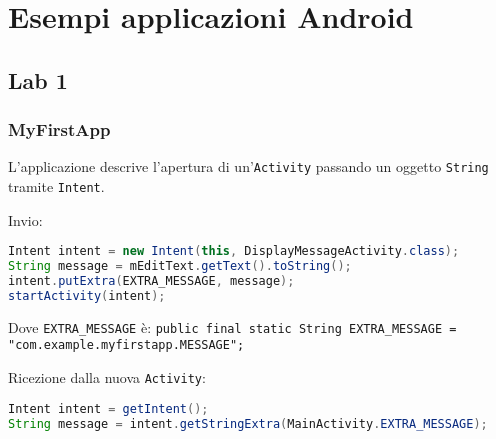 \newcommand{\Activity}{\texttt{Activity}\xspace}
\newcommand{\Intent}{\texttt{Intent}\xspace}
\newcommand{\View}{\texttt{View}\xspace}
\newcommand{\ViewGroup}{\texttt{ViewGroup}\xspace}
\newcommand{\LinearLayout}{\texttt{LinearLayout}\xspace}
\newcommand{\RelativeLayout}{\texttt{RelativeLayout}\xspace}
\newcommand{\ScrollView}{\texttt{ScrollView}\xspace}
\newcommand{\ListView}{\texttt{ListView}\xspace}
\newcommand{\SharedPreferences}{\texttt{SharedPreferences}\xspace}
\newcommand{\ListFragment}{\texttt{ListFragment}\xspace}
\newcommand{\MainActivity}{\texttt{MainActivity}\xspace}
\newcommand{\AsyncTask}{\texttt{AsyncTask}\xspace}
\newcommand{\FrameLayout}{\texttt{FrameLayout}\xspace}
\newcommand{\WorkoutListFragment}{\texttt{WorkoutListFragment}\xspace}
\newcommand{\Fragment}{\texttt{Fragment}\xspace}
\newcommand{\SQLiteDatabase}{\texttt{SQLiteDatabase}\xspace}
\newcommand{\SQLiteOpenHelper}{\texttt{SQLiteOpenHelper}\xspace}
\newcommand{\Cursor}{\texttt{Cursor}\xspace}

\chapter{Esempi applicazioni Android}


\section{Lab 1}

\subsection{MyFirstApp}

L'applicazione descrive l'apertura di un'\texttt{Activity} passando un oggetto \texttt{String} tramite \texttt{Intent}.

Invio:
\begin{lstlisting}[language=Java]
Intent intent = new Intent(this, DisplayMessageActivity.class);
String message = mEditText.getText().toString();
intent.putExtra(EXTRA_MESSAGE, message);
startActivity(intent);
\end{lstlisting}

Dove \lstinline|EXTRA_MESSAGE| è:
\lstinline|public final static String EXTRA_MESSAGE = "com.example.myfirstapp.MESSAGE";|

Ricezione dalla nuova \Activity:
\begin{lstlisting}[language=Java]
Intent intent = getIntent();
String message = intent.getStringExtra(MainActivity.EXTRA_MESSAGE);
\end{lstlisting}


